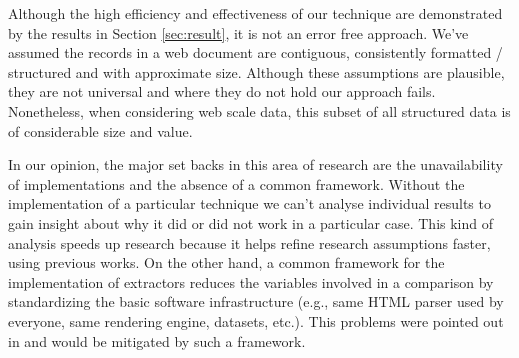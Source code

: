 \documentclass{vldb}
\begin{document}
Although the high efficiency and effectiveness of our technique are demonstrated
by the results in Section \ref{sec:result}, it is not an error free approach.
We've assumed the records in a web document are contiguous, consistently
formatted / structured and with approximate size. Although these assumptions are
plausible, they are not universal and where they do not hold our approach fails.
Nonetheless, when considering web scale data, this subset of all structured data
is of considerable size and value.

In our opinion, the major set backs in this area of research are the
unavailability of implementations and the absence of a common framework.
Without the implementation of a particular technique we can't analyse individual
results to gain insight about why it did or did not work in a particular case.
This kind of analysis speeds up research because it helps refine research
assumptions faster, using previous works. On the other hand, a common framework
for the implementation of extractors reduces the variables involved in a
comparison by standardizing the basic software infrastructure (e.g., same HTML
parser used by everyone, same rendering engine, datasets, etc.). This problems
were pointed out in \cite{survey2013,survey2014} and would be mitigated by such
a framework.
 
\end{document}
